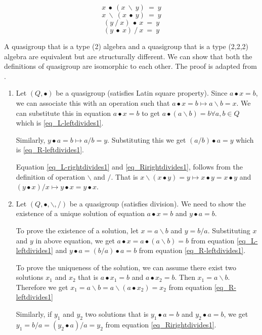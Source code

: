 \begin{equation} \label{eq_L-leftdivides1}
  x\ ∙\ (x\ \backslash\ y) \ = \ y
\end{equation}
\begin{equation} \label{eq_L-rightdivides1}
  x\ \backslash\ (x\ ∙\ y)\ = \ y
\end{equation}
\begin{equation} \label{eq_R-leftdivides1}
  (y\ /\ x)\ ∙\ x \ =\ y
\end{equation}
\begin{equation} \label{eq_Rirightdivides1}
  (y\ ∙\ x)\ /\ x \ =\ y
\end{equation}

A quasigroup that is a type (2) algebra and a quasigroup that is a type (2,2,2)
algebra are equivalent but are structurally different. We can show that both the
definitions of quasigroup are isomorphic to each other. The proof is adapted
from \cite{shcherbacov2003elements}.

\begin{enumerate}
  \item 
Let $(Q, ∙)$ be a quasigroup (satisfies Latin square property). Since $ a ∙ x =
b$, we can associate this with an operation such that $a ∙ x = b \mapsto a
\backslash b = x$. We can substitute this in equation $a ∙ x = b$ to get $a ∙ (a
\backslash b) = b \forall a,b \in Q$ which is \ref{eq_L-leftdivides1}.

Similarly, $y ∙ a = b \mapsto a / b = y$. Substituting this we get $ (a / b) ∙ a
= y$ which is \ref{eq_R-leftdivides1}.

Equation \ref{eq_L-rightdivides1} and \ref{eq_Rirightdivides1}, follows from the
definition of operation $\backslash$ and $/$. That is $x \backslash (x ∙ y) = y \mapsto x
∙ y = x ∙ y$ and $(y ∙ x) /x \mapsto y ∙ x = y ∙ x$.

\item 
Let $(Q,∙, \backslash, /)$ be a quasigroup (satisfies division). We need to show
the existence of a unique solution of equation $ a ∙ x = b$ and $y ∙ a = b$.

To prove the existence of a solution, let $x = a\backslash b$ and $y = b / a$.
Substituting $x$ and $y$ in above equation, we get $a ∙ x = a ∙ (a \backslash b)
= b$ from equation \ref{eq_L-leftdivides1} and $ y ∙ a = (b / a) ∙ a = b$ from
equation \ref{eq_R-leftdivides1}.

To prove the uniqueness of the solution, we can assume there exist two solutions
$x_1$ and $x_2$ that is $a ∙ x_1 = b$ and $a ∙ x_2 = b$. Then $x_1 = a
\backslash b$. Therefore we get $x_1 = a \backslash b = a \backslash (a ∙ x_2) =
x_2$ from equation \ref{eq_R-leftdivides1}

Similarly, if $y_1$ and $y_2$ two solutions that is $y_1 ∙ a = b$ and $y_2 ∙ a = b$, we get 
$y_1 = b / a = (y_2 ∙ a) / a = y_2$ from equation \ref{eq_Rirightdivides1}.

\end{enumerate}

